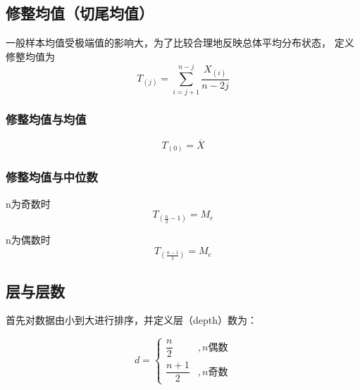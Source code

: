 \documentclass[UTF8]{ctexart}
\numberwithin{equation}{section}
\begin{document}
\subsection{修整均值（切尾均值）}
一般样本均值受极端值的影响大，为了比较合理地反映总体平均分布状态，
定义修整均值为
\begin{equation}
    T_{(j)} = \sum_{i=j+1}^{n-j} \dfrac{X_{(i)}}{n-2j}
\end{equation}

\subsubsection{修整均值与均值}
\begin{equation}
    T_{(0)} = \overline{X}
\end{equation}

\subsubsection{修整均值与中位数}

n为奇数时
\begin{equation}
    T_{(\frac{n}{2}-1)} = M_e
\end{equation}

n为偶数时
\begin{equation}
    T_{(\frac{n-1}{2})} = M_e
\end{equation}

\subsection{层与层数}
首先对数据由小到大进行排序，并定义层（depth）数为：

\begin{equation}
    d = 
    \begin{cases}
        \dfrac{n}{2} &, n \mbox{偶数} \\[1em]
        \dfrac{n+1}{2} &, n \mbox{奇数}
    \end{cases}
\end{equation}
\end{document}
